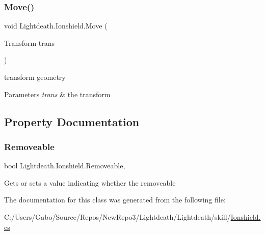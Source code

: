 \subsubsection{\texorpdfstring{Move()}{Move()}}
{\footnotesize\ttfamily void Lightdeath.\+Ionshield.\+Move (\begin{DoxyParamCaption}\item[{Transform}]{trans }\end{DoxyParamCaption})\hspace{0.3cm}{\ttfamily [inline]}}



transform geometry 


\begin{DoxyParams}{Parameters}
{\em trans} & the transform\\
\hline
\end{DoxyParams}


\subsection{Property Documentation}
\hypertarget{class_lightdeath_1_1_ionshield_a22fd3ab45846892222735636dc719bb9}{}\label{class_lightdeath_1_1_ionshield_a22fd3ab45846892222735636dc719bb9} 
\subsubsection{\texorpdfstring{Removeable}{Removeable}}
{\footnotesize\ttfamily bool Lightdeath.\+Ionshield.\+Removeable\hspace{0.3cm}{\ttfamily [get]}, {\ttfamily [set]}}



Gets or sets a value indicating whether the removeable 



The documentation for this class was generated from the following file\+:\begin{DoxyCompactItemize}
\item 
C\+:/\+Users/\+Gabo/\+Source/\+Repos/\+New\+Repo3/\+Lightdeath/\+Lightdeath/skill/\hyperlink{_ionshield_8cs}{Ionshield.\+cs}\end{DoxyCompactItemize}
